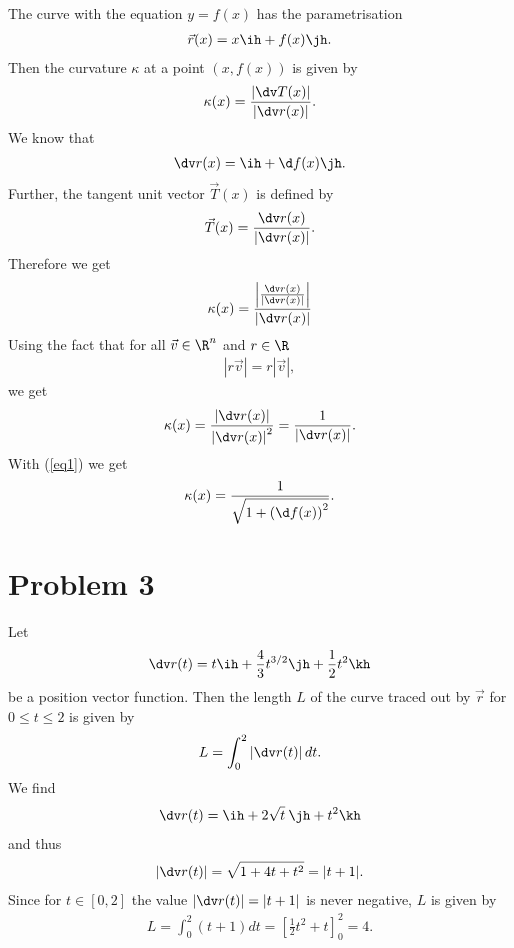 \documentclass{article}
\begin{document}
The curve with the equation $y=f(x)$ has the parametrisation
\begin{align*}
	\vec r(x) = x \ih + f(x) \jh.
\end{align*}
Then the curvature $\kappa$ at a point $(x, f(x))$ is given by
\begin{align*}
	\kappa(x) = \frac{\left|\dv T(x)\right|}{\left|\dv r(x)\right|}.
\end{align*}
We know that
\begin{align}
	\label{eq1}
	\dv r (x) = \ih + \d f(x) \jh.
\end{align}
Further, the tangent unit vector $\vec T(x)$ is defined by
\begin{align*}
	\vec T(x) = \frac{\dv r(x)}{\left|\dv r(x)\right|}.
\end{align*}
Therefore we get
\begin{align*}
	\kappa(x) = \frac{\left|\frac{\dv r(x)}{\left|\dv r(x)\right|}\right|}{\left|\dv r(x)\right|}
\end{align*}
Using the fact that for all $\vec v \in \R^n$ and $r\in\R$
\begin{align*}
	\left|r\vec v\right| = r\left|\vec v\right|,
\end{align*}
we get
\begin{align*}
	\kappa(x) = \frac{\left|\dv r(x)\right|}{\left|\dv r(x)\right|^2} = \frac{1}{|\dv r(x)|}.
\end{align*}
With (\ref{eq1}) we get
\begin{align*}
	\kappa(x) = \frac{1}{\sqrt{1+\left(\d f(x)\right)^2}}.
\end{align*}


\section*{Problem 3}


Let
\begin{align*}
	\dv r(t) = t\ih + \frac{4}{3}t^{3/2}\jh + \frac{1}{2}t^2\kh
\end{align*}
be a position vector function.
Then the length $L$ of the curve traced out by $\vec r$ for $0\leq t \leq 2$ is given by
\begin{align*}
	L = \int_0^2 \left|\dv r(t)\right|dt.
\end{align*}
We find
\begin{align*}
	\dv r(t) = \ih + 2\sqrt{t}\:\jh + t^2\kh
\end{align*}
and thus
\begin{align*}
	|\dv r(t)| = \sqrt{1 + 4t + t^2}=|t+1|.
\end{align*}
Since for $t\in[0,2]$ the value $|\dv r(t)|=|t+1|$ is never
negative, $L$ is given by
\begin{align*}
	L = \int_0^2 (t+1)dt = \left[\frac{1}{2}t^2+t\right]_0^2=4.
\end{align*}
\end{document}
